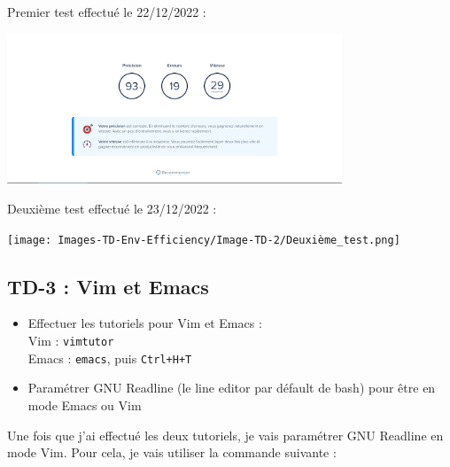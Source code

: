 \documentclass[12pt]{article}
\begin{document}
\vspace{0.3cm}

Premier test effectué le 22/12/2022 : 

\begin{center}
  \includegraphics[width=10cm]{Images-TD-Env-Efficiency/Image-TD-2/Premier_test.png}
\end{center}

\vspace{0.3cm}

\newpage

Deuxième test effectué le 23/12/2022 :

\begin{center}
  \texttt{[image: Images-TD-Env-Efficiency/Image-TD-2/Deuxième\_test.png]}
\end{center}

\subsection{TD-3 : Vim et Emacs}

\begin{itemize}
  \item Effectuer les tutoriels pour Vim et Emacs :\\
  Vim : \texttt{vimtutor}\\
  Emacs : \texttt{emacs}, puis \texttt{Ctrl+H+T}
\end{itemize}

\vspace{0.3cm}

\begin{itemize}
  \item Paramétrer GNU Readline (le line editor par défault de bash) pour être en mode Emacs ou Vim
\end{itemize}

\vspace{0.3cm}

Une fois que j'ai effectué les deux tutoriels, je vais paramétrer GNU Readline en mode Vim. Pour cela, je vais utiliser la commande suivante :
\end{document}
